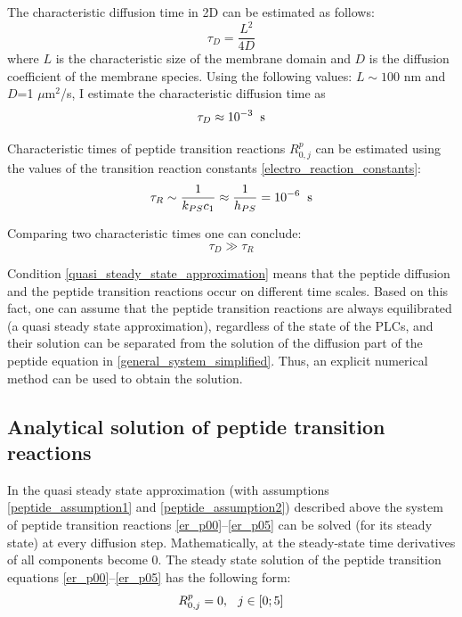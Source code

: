 The characteristic diffusion time in 2D can be estimated as follows:
\begin{equation}
 \tau_D = \frac{L^2}{4D}
\end{equation}
where $L$ is the characteristic size of the membrane domain and $D$ is the diffusion coefficient of the membrane species. Using the following values: $L\sim 100$ nm and $D$=1 $\mu$m$^2$/s, I estimate the characteristic diffusion time as
\begin{equation}
 \tau_D\approx10^{-3} \hspace{0.08in} \text{s}
\end{equation}

Characteristic times of peptide transition reactions $R_{0,j}^p$ can be estimated using the values of the transition reaction constants \eqref{electro_reaction_constants}:
\begin{equation}
 \tau_R \sim \frac{1}{k_{PS} c_1} \approx \frac{1}{h_{PS}} = 10^{-6} \hspace{0.08in} \text{s}
\end{equation}

Comparing two characteristic times one can conclude:
\begin{equation}
 \label{quasi_steady_state_approximation}
\tau_D \gg \tau_R
\end{equation}

Condition \eqref{quasi_steady_state_approximation} means that the peptide diffusion and the peptide transition reactions occur on different time scales. Based on this fact, one can assume that the peptide transition reactions are always equilibrated (a quasi steady state approximation), regardless of the state of the PLCs, and their solution can be separated from the solution of the diffusion part of the peptide equation in \eqref{general_system_simplified}. Thus, an explicit numerical method can be used to obtain the solution.

\subsection{Analytical solution of peptide transition reactions}

\label{analytical_electro_reaction}

In the quasi steady state approximation (with assumptions \eqref{peptide_assumption1} and \eqref{peptide_assumption2}) described above the system of peptide transition reactions \eqref{er_p00}--\eqref{er_p05} can be solved (for its steady state) at every diffusion step. Mathematically, at the steady-state time derivatives of all components become 0. The steady state solution of the peptide transition equations \eqref{er_p00}--\eqref{er_p05} has the following form:
\begin{equation}
 \label{peptide_steady_state}R_{0,j}^p = 0,\hspace{0.1in} j\in[0;5]
\end{equation}


